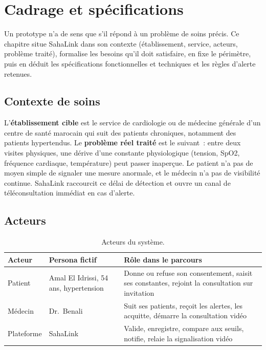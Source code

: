 \chapter{Cadrage et spécifications}
\label{chap:cadrage}

\introchap

Un prototype n'a de sens que s'il répond à un problème de soins précis. Ce chapitre situe SahaLink dans son contexte (établissement, service, acteurs, problème traité), formalise les besoins qu'il doit satisfaire, en fixe le périmètre, puis en déduit les spécifications fonctionnelles et techniques et les règles d'alerte retenues.

\section{Contexte de soins}

L'\textbf{établissement cible} est le service de cardiologie ou de médecine générale d'un centre de santé marocain qui suit des patients chroniques, notamment des patients hypertendus. Le \textbf{problème réel traité} est le suivant~: entre deux visites physiques, une dérive d'une constante physiologique (tension, \ac{SpO2}, fréquence cardiaque, température) peut passer inaperçue. Le patient n'a pas de moyen simple de signaler une mesure anormale, et le médecin n'a pas de visibilité continue. SahaLink raccourcit ce délai de détection et ouvre un canal de téléconsultation immédiat en cas d'alerte.

\section{Acteurs}

\begin{table}[H]
\centering
\caption{Acteurs du système.}
\label{tab:acteurs}
\begin{tabularx}{\textwidth}{@{}l l X@{}}
\toprule
\textbf{Acteur} & \textbf{Persona fictif} & \textbf{Rôle dans le parcours} \\
\midrule
Patient & Amal El Idrissi, 54 ans, hypertension & Donne ou refuse son consentement, saisit ses constantes, rejoint la consultation sur invitation \\
Médecin & Dr.~Benali & Suit ses patients, reçoit les alertes, les acquitte, démarre la consultation vidéo \\
Plateforme & SahaLink & Valide, enregistre, compare aux seuils, notifie, relaie la signalisation vidéo \\
\bottomrule
\end{tabularx}
\end{table}

